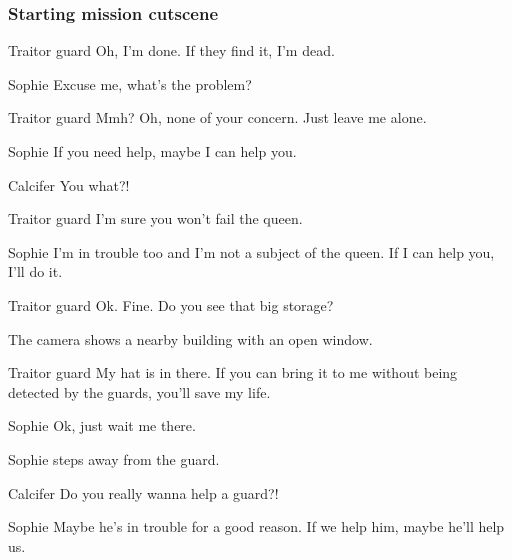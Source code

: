 \subsubsection*{Starting mission cutscene}
\begin{screenplay}

\begin{dialogue}[forlorn]{Traitor guard}
Oh, I'm done. If they find it, I'm dead.
\end{dialogue}

\begin{dialogue}{Sophie}
Excuse me, what's the problem?
\end{dialogue}

\begin{dialogue}[forlorn]{Traitor guard}
Mmh? Oh, none of your concern. Just leave me alone.
\end{dialogue}

\begin{dialogue}{Sophie}
If you need help, maybe I can help you.
\end{dialogue}

\begin{dialogue}[surprised]{Calcifer}
You what?!
\end{dialogue}

\begin{dialogue}[forlorn]{Traitor guard}
I'm sure you won't fail the queen.
\end{dialogue}

\begin{dialogue}{Sophie}
I'm in trouble too and I'm not a subject of the queen. If I can help you, I'll do it.
\end{dialogue}

\begin{dialogue}[weird]{Traitor guard}
Ok. Fine. Do you see that big storage?
\end{dialogue}

The camera shows a nearby building with an open window.

\begin{dialogue}[continuing]{Traitor guard}
My hat is in there. If you can bring it to me without being detected by the guards, you'll save my life.
\end{dialogue}

\begin{dialogue}{Sophie}
Ok, just wait me there.
\end{dialogue}

Sophie steps away from the guard.

\begin{dialogue}[disappointed]{Calcifer}
Do you really wanna help a guard?!
\end{dialogue}

\begin{dialogue}{Sophie}
Maybe he's in trouble for a good reason. If we help him, maybe he'll help us.
\end{dialogue}

\end{screenplay}

